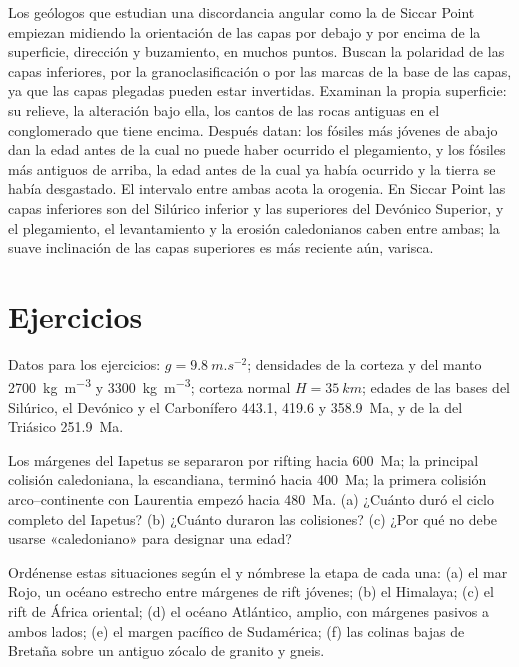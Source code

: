 \begin{inthefield}
Los geólogos que estudian una discordancia angular como la de Siccar Point empiezan midiendo la
orientación de las capas por debajo y por encima de la superficie, dirección y buzamiento, en muchos puntos. Buscan
la polaridad de las capas inferiores, por la granoclasificación o por las marcas de la base de las capas,
ya que las capas plegadas pueden estar invertidas. Examinan la propia superficie: su relieve, la
alteración bajo ella, los cantos de las rocas antiguas en el conglomerado que tiene encima. Después
datan: los fósiles más jóvenes de abajo dan la edad antes de la cual no puede haber ocurrido el plegamiento,
y los fósiles más antiguos de arriba, la edad antes de la cual ya había ocurrido y la tierra se había
desgastado. El intervalo entre ambas acota la orogenia. En Siccar Point las capas inferiores son del Silúrico
inferior y las superiores del Devónico Superior, y el plegamiento, el levantamiento y la erosión caledonianos caben
entre ambas; la suave inclinación de las capas superiores es más reciente aún, varisca.
\end{inthefield}

\section*{Ejercicios}\label{sec:b2:wilson-cycle:exercises}

Datos para los ejercicios: $g = \qty{9.8}{m.s^{-2}}$; densidades de la corteza y del manto
\qty{2700}{kg.m^{-3}} y \qty{3300}{kg.m^{-3}}; corteza normal $H = \qty{35}{km}$; edades de las
bases del Silúrico, el Devónico y el Carbonífero 443.1, 419.6 y \qty{358.9}{Ma}, y de la del
Triásico \qty{251.9}{Ma}.

\begin{exercise}[$\star$]\label{exo:b2:wilson-cycle:1}
Los márgenes del Iapetus se separaron por rifting hacia \qty{600}{Ma}; la principal colisión caledoniana, la
escandiana, terminó hacia \qty{400}{Ma}; la primera colisión arco--continente con Laurentia empezó
hacia \qty{480}{Ma}. (a) ¿Cuánto duró el ciclo completo del Iapetus? (b) ¿Cuánto duraron las
colisiones? (c) ¿Por qué no debe usarse «caledoniano» para designar una edad?
\end{exercise}

\begin{exercise}[$\star$]\label{exo:b2:wilson-cycle:2}
Ordénense estas situaciones según el  y nómbrese la etapa de cada una: (a) el
mar Rojo, un océano estrecho entre márgenes de rift jóvenes; (b) el Himalaya; (c) el rift de África
oriental; (d) el océano Atlántico, amplio, con márgenes pasivos a ambos lados; (e) el margen pacífico
de Sudamérica; (f) las colinas bajas de Bretaña sobre un antiguo zócalo de granito y gneis.
\end{exercise}

